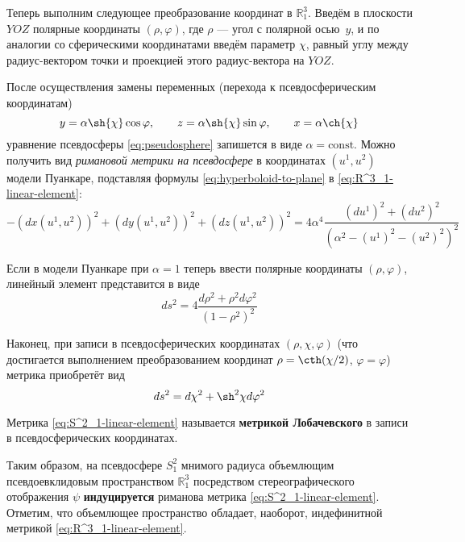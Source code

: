 \documentclass{article}
\numberwithin{equation}{section}
\renewcommand{\phi}{\varphi}
\newcommand{\neword}[1]{\textbf{#1}}
\begin{document}


Теперь выполним следующее преобразование координат в $\mathbb{R}^3_1$.
Введём в плоскости $YOZ$ полярные координаты $(\rho, \phi)$, где
$\rho$ — угол с полярной осью $y$, и по аналогии со сферическими
координатами введём параметр $\chi$, равный углу между
радиус-вектором точки и проекцией этого радиус-вектора на $YOZ$.

После осуществления замены переменных (перехода к псевдосферическим
координатам)
\begin{equation*}\label{eq:pseudospheric-coords}
  y = \alpha \sh{\chi} \cos{\phi}, \qquad
  z = \alpha \sh{\chi} \sin{\phi}, \qquad
  x = \alpha \ch{\chi}
\end{equation*}
уравнение псевдосферы \eqref{eq:pseudosphere} запишется в виде $\alpha = \text{const}$. Можно
получить вид \emph{римановой метрики на псевдосфере} в координатах
$(u^1, u^2)$ модели Пуанкаре, подставляя формулы
\eqref{eq:hyperboloid-to-plane} в \eqref{eq:R^3_1-linear-element}:
\begin{equation*}
  -(dx(u^1, u^2))^2 + (dy(u^1, u^2))^2 + (dz(u^1, u^2))^2 =
  4\alpha^4\frac{(du^1)^2 + (du^2)^2}
                {\left (\alpha^2 - (u^1)^2-(u^2)^2 \right )^2}
\end{equation*}

Если в модели Пуанкаре при $\alpha=1$ теперь ввести полярные
координаты $(\rho, \phi)$, линейный элемент представится в виде
\begin{equation}\label{eq:poincare-lin-elt-polar}
  ds^2 = 4\frac{d\rho^2 + \rho^2 d\phi^2}{\left (1 - \rho^2 \right )^2}
\end{equation}

Наконец, при записи в псевдосферических координатах $(\rho, \chi, \phi)$
(что достигается выполнением преобразованием координат $\rho =
\cth(\chi/2)$, $\phi=\phi$) метрика приобретёт вид
\begin{equation}\label{eq:S^2_1-linear-element}
  ds^2 = d\chi^2 + \sh^2{\chi}d\phi^2
\end{equation}

Метрика \eqref{eq:S^2_1-linear-element} называется \neword{метрикой
  Лобачевского} в записи в псевдосферических координатах.

Таким образом, на псевдосфере $S^2_1$ мнимого радиуса объемлющим
псевдоевклидовым пространством $\mathbb{R}^3_1$ посредством
стереографического отображения $\psi$ \neword{индуцируется} риманова
метрика \eqref{eq:S^2_1-linear-element}. Отметим, что объемлющее
пространство обладает, наоборот, индефинитной метрикой
\eqref{eq:R^3_1-linear-element}.
\end{document}
